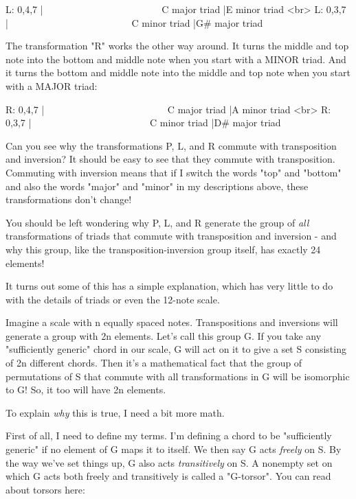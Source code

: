 L: {0,4,7} |        
\ \ \ \ \ \ \ \ \ \ \ \       
\ \ \ \ \ \ \ \ \ \ \ \       
    C major triad |\to  E minor triad <br>
L: {0,3,7} |\to  {8,0,3}       
\ \ \ \ \ \ \ \ \ \ \ \       
\ \ \ \ \ \ \ \ \ \ \ \ 
\ 
      C minor triad |\to  G# major triad

The transformation "R" works the other way around.   It turns the 
middle and top note into the bottom and middle note when you start 
with a MINOR triad.  And it turns the bottom and middle note into 
the middle and top note when you start with a MAJOR triad:

R: {0,4,7} |\to  {9,0,4}          
\ \ \ \ \ \ \ \ \ \ \ \       
\ \ \ \ \ \ \ \ \ \ \ \       
\ 
   C major triad |\to  A minor triad <br>
R: {0,3,7} |\to  {3,7,10}        
\ \ \ \ \ \ \ \ \ \ \ \       
\ \ \ \ \ \ \ \ \ \ \ \       
    C minor triad |\to  D# major triad

Can you see why the transformations P, L, and R commute with 
transposition and inversion?   It should be easy to see that they 
commute with transposition.  Commuting with inversion means that 
if I switch the words "top" and "bottom" and also the words "major" 
and "minor" in my descriptions above, these transformations don't 
change!

You should be left wondering why P, L, and R generate the group
of \emph{all} transformations of triads that commute with transposition
and inversion - and why this group, like the transposition-inversion
group itself, has exactly 24 elements!  

It turns out some of this has a simple explanation, which has very 
little to do with the details of triads or even the 12-note scale.  
  
Imagine a scale with n equally spaced notes.   Transpositions
and inversions will generate a group with 2n elements.  Let's 
call this group G.  If you take any "sufficiently generic" chord 
in our scale, G will act on it to give a set S consisting of 2n 
different chords.  Then it's a mathematical fact that the group of 
permutations of S that commute with all transformations in G 
will be isomorphic to G!  So, it too will have 2n elements.

To explain \emph{why} this is true, I need a bit more math.

First of all, I need to define my terms.  I'm defining a chord 
to be "sufficiently generic" if no element of G maps it to itself.  
We then say G acts \emph{freely} on S.  By the way we've set 
things up, G also acts \emph{transitively} on S.  A nonempty set on which G 
acts both freely and transitively is called a "G-torsor".  You can 
read about torsors here:

